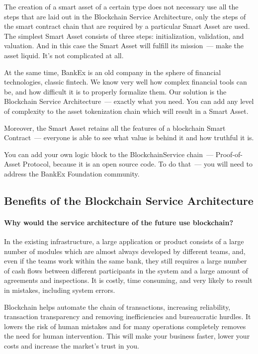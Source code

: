 \documentclass{article}
\begin{document}
\begin{multicols}{2}
The creation of a smart asset of a certain type does not necessary use all the steps that are laid out in the Blockchain Service Architecture, only the steps of the smart contract chain that are required by a particular Smart Asset are used. The simplest Smart Asset consists of three steps: initialization, validation, and valuation. And in this case the Smart Asset will fulfill its mission~--- make the asset liquid. It’s not complicated at all. 

At the same time, BankEx is an old company in the sphere of financial technologies, classic fintech. We know very well how complex financial tools can be, and how difficult it is to properly formalize them. Our solution is the Blockchain Service Architecture~--- exactly what you need. You can add any level of complexity to the asset tokenization chain which will result in a Smart Asset.

Moreover, the Smart Asset retains all the features of a blockchain Smart Contract~--- everyone is able to see what value is behind it and how truthful it is. 

You can add your own logic block to the BlockchainService chain~--- Proof-of-Asset Protocol, because it is an open source code. To do that~--- you will need to address the BankEx Foundation community.

\subsection{Benefits of the Blockchain Service Architecture}

\paragraph*{Why would the service architecture of the future use blockchain?} In the existing infrastructure, a large application or product consists of a large number of modules which are almost always developed by different teams, and, even if the teams work within the same bank, they still requires a large number of cash flows between different participants in the system and a large amount of agreements and inspections. It is costly, time consuming, and very likely to result in mistakes, including system errors.

Blockchain helps automate the chain of transactions, increasing reliability, transaction transparency and removing inefficiencies and bureaucratic hurdles. It lowers the risk of human mistakes and for many operations completely removes the need for human intervention. This will make your business faster, lower your costs and increase the market's trust in you.


\end{multicols}
\end{document}

